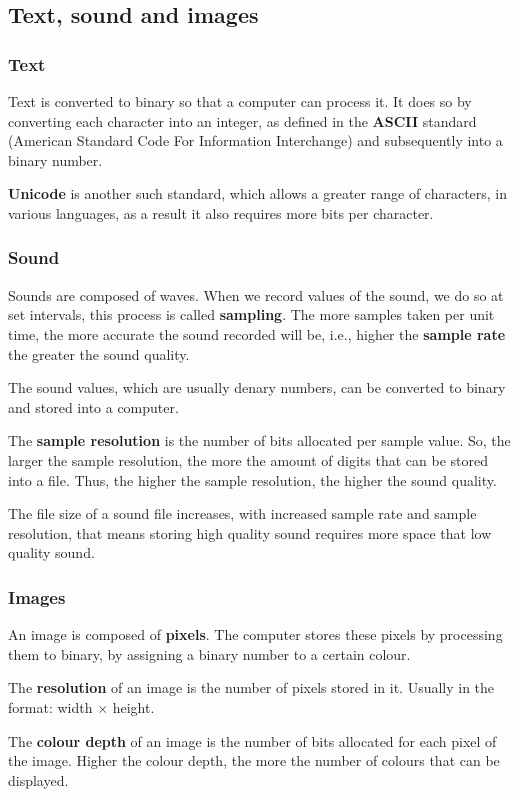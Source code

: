 \documentclass{article}
\begin{document}
\subsection{Text, sound and images}
\subsubsection{Text}
Text is converted to binary so that a computer can process it. It does so by converting
each character into an integer, as defined in the \textbf{ASCII} standard (American 
Standard Code For Information Interchange) and subsequently into a binary number.

\textbf{Unicode} is another such standard, which allows a greater range of characters, in
various languages, as a result it also requires more bits per character.

\subsubsection{Sound}
Sounds are composed of waves. When we record values of the sound, we do so at set 
intervals, this process is called \textbf{sampling}. The more samples taken per unit
time, the more accurate the sound recorded will be, i.e., higher the \textbf{sample rate}
the greater the sound quality.

The sound values, which are usually denary numbers, can be converted to binary and stored
into a computer.

The \textbf{sample resolution} is the number of bits allocated per sample value. So, the 
larger the sample resolution, the more the amount of digits that can be stored into a 
file. Thus, the higher the sample resolution, the higher the sound quality.

The file size of a sound file increases, with increased sample rate and sample 
resolution, that means storing high quality sound requires more space that low quality
sound.

\subsubsection{Images}
An image is composed of \textbf{pixels}. The computer stores these pixels by processing
them to binary, by assigning a binary number to a certain colour. 

The \textbf{resolution} of an image is the number of pixels stored in it. Usually in the
format: width $\times$ height.

The \textbf{colour depth} of an image is the number of bits allocated for each pixel
of the image. Higher the colour depth, the more the number of colours that can be
displayed.
\end{document}
